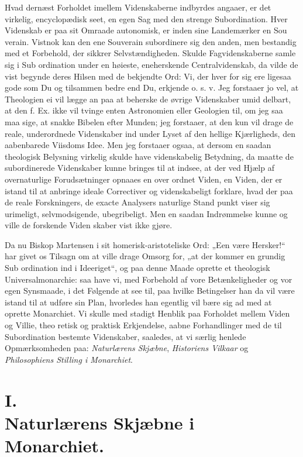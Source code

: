 \documentclass[12pt]{book}
\newcommand{\opage}[1]{\marginnote{\footnotesize\textit{[#1]}}}
\begin{document}
Hvad dernæst Forholdet imellem Videnskaberne indbyrdes
angaaer, er det virkelig, encyclopædisk seet, en egen Sag
med den strenge Subordination. Hver Videnskab er paa sit
Omraade autonomisk, er inden sine Landemærker en Sou\-%
verain. Vistnok kan den ene Souverain subordinere sig
den anden, men bestandig med et Forbehold, der sikkrer
Selvstændigheden. Skulde Fagvidenskaberne samle sig i Sub\-%
ordination under en høieste, eneherskende Centralvidenskab, da
vilde de vist begynde deres Hilsen med de bekjendte Ord:
\opage{8}\setcounter{footnote}{0}%
Vi, der hver for sig ere ligesaa gode som Du og tilsammen bedre
end Du, erkjende o. s. v. Jeg forstaaer jo vel, at Theologien
ei vil lægge an paa at beherske de øvrige Videnskaber umid\-%
delbart, at den f. Ex. ikke vil tvinge enten Astronomien eller
Geologien til, om jeg saa maa sige, at snakke Bibelen efter
Munden; jeg forstaaer, at den kun vil drage de reale,
underordnede Videnskaber ind under Lyset af den hellige
Kjærligheds, den aabenbarede Viisdoms Idee. Men jeg
forstaaer ogsaa, at dersom en saadan theologisk Belysning
virkelig skulde have videnskabelig Betydning, da maatte de
subordinerede Videnskaber kunne bringes til at indsee, at der
ved Hjælp af overnaturlige Forudsætninger opnaaes en over\-%
ordnet Viden, en Viden, der er istand til at anbringe
ideale Correctiver og videnskabeligt forklare, hvad der paa de
reale Forskningers, de exacte Analysers naturlige Stand\-%
punkt viser sig urimeligt, selvmodsigende, ubegribeligt. Men
en saadan Indrømmelse kunne og ville de forskende Viden\-%
skaber vist ikke gjøre.

Da nu Biskop Martensen i sit homerisk-aristoteliske
Ord: „Een være Hersker!“ har givet os Tilsagn om at
ville drage Omsorg for, „at der kommer en grundig Sub\-%
ordination ind i Ideeriget“, og paa denne Maade oprette
et theologisk Universalmonarchie: saa have vi, med Forbehold
af vore Betænkeligheder og vor egen Synsmaade, i det
Følgende at see til, paa hvilke Betingelser han da vil være
istand til at udføre sin Plan, hvorledes han egentlig vil
bære sig ad med at oprette Monarchiet. Vi skulle med
stadigt Henblik paa Forholdet mellem Viden og Villie, theo\-%
retisk og praktisk Erkjendelse, aabne Forhandlinger med de til
Subordination bestemte Videnskaber, saaledes, at vi særlig
henlede Opmærksomheden paa: \emph{Naturlærens Skjæbne},
\emph{Historiens Vilkaar} og \emph{Philosophiens Stilling i
Monarchiet}.

\opage{9}\setcounter{footnote}{0}%
\section*{I.\\ Naturlærens Skjæbne i Monarchiet.}
\end{document}
